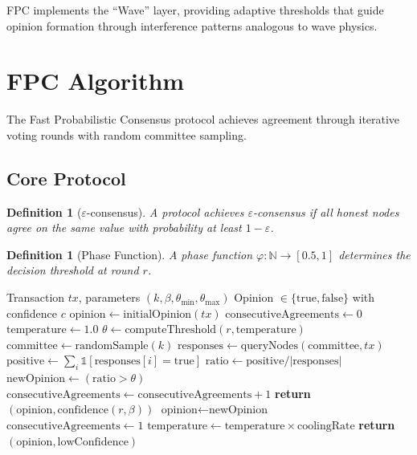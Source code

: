 \documentclass[11pt,a4paper]{article}
\newtheorem{definition}[theorem]{Definition}
\begin{document}
FPC implements the ``Wave'' layer, providing adaptive thresholds that guide opinion formation through interference patterns analogous to wave physics.

\section{FPC Algorithm}
\label{sec:algorithm}

The Fast Probabilistic Consensus protocol achieves agreement through iterative voting rounds with random committee sampling.

\subsection{Core Protocol}

\begin{definition}[$\varepsilon$-consensus]
A protocol achieves $\varepsilon$-consensus if all honest nodes agree on the same value with probability at least $1 - \varepsilon$.
\end{definition}

\begin{definition}[Phase Function]
A phase function $\varphi: \mathbb{N} \to [0.5, 1]$ determines the decision threshold at round $r$.
\end{definition}

\begin{algorithm}
\caption{Fast Probabilistic Consensus}
\label{alg:fpc}
\begin{algorithmic}[1]
\REQUIRE Transaction $tx$, parameters $(k, \beta, \theta_{\min}, \theta_{\max})$
\ENSURE Opinion $\in \{\text{true}, \text{false}\}$ with confidence $c$
\STATE $\text{opinion} \gets \text{initialOpinion}(tx)$
\STATE $\text{consecutiveAgreements} \gets 0$
\STATE $\text{temperature} \gets 1.0$
    \STATE $\theta \gets \text{computeThreshold}(r, \text{temperature})$
    \STATE $\text{committee} \gets \text{randomSample}(k)$
    \STATE $\text{responses} \gets \text{queryNodes}(\text{committee}, tx)$
    \STATE $\text{positive} \gets \sum_{i} \mathbb{1}[\text{responses}[i] = \text{true}]$
    \STATE $\text{ratio} \gets \text{positive} / |\text{responses}|$
    \STATE $\text{newOpinion} \gets (\text{ratio} > \theta)$
        \STATE $\text{consecutiveAgreements} \gets \text{consecutiveAgreements} + 1$
            \STATE \textbf{return} $(\text{opinion}, \text{confidence}(r, \beta))$
        \ENDIF
    \ELSE
        \STATE $\text{opinion} \gets \text{newOpinion}$
        \STATE $\text{consecutiveAgreements} \gets 1$
    \ENDIF
    \STATE $\text{temperature} \gets \text{temperature} \times \text{coolingRate}$
\ENDFOR
\STATE \textbf{return} $(\text{opinion}, \text{lowConfidence})$
\end{algorithmic}
\end{algorithm}
\end{document}
